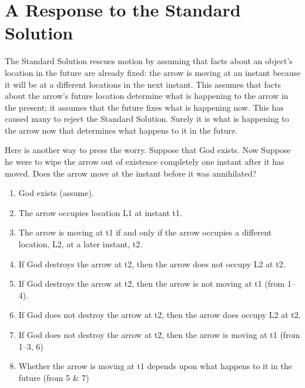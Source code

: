 \documentclass[oneside]{article}
\begin{document}







\section*{A Response to the Standard Solution}

The Standard Solution rescues motion by assuming that facts  about an object's location in the future are already fixed: the arrow is moving at an instant because it will be at a different locations in the next instant. This assumes that facts about the arrow's future location determine what is happening to the arrow in the present; it assumes that the future fixes what is happening now. This has caused many to reject the Standard Solution. Surely it is what is happening to the arrow now that determines what happens to it in the future.  

Here is another way to press the worry. Suppose that God exists. Now Suppose he were to wipe the arrow out of existence completely one instant after it has moved. Does the arrow move at the instant before it was annihilated?  

\begin{enumerate}
\item God exists (assume).
\item The arrow occupies location L1 at instant t1.
\item The arrow is moving at t1 if and only if the arrow occupies a different location, L2, at a later instant, t2. 
\item If God destroys the arrow at t2, then the arrow does not occupy L2 at t2.
\item If God destroys the arrow at t2, then the arrow is not moving at t1 (from 1--4).
\item If God does not destroy the arrow at t2, then the arrow does occupy L2 at t2. 
\item If God does not destroy the arrow at t2, then the arrow is moving at t1 (from 1--3, 6)
\item Whether the arrow is moving at t1 depends upon what happens to it in the future (from 5 \& 7) 
\end{enumerate}
\end{document}
